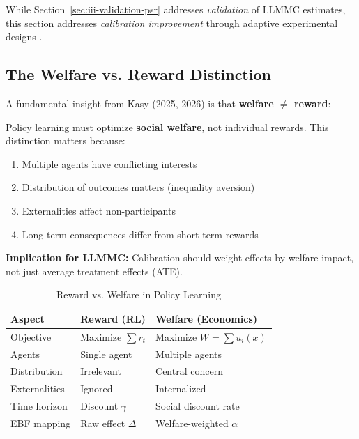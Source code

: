 While Section~\ref{sec:iii-validation-psr} addresses \emph{validation} of LLMMC estimates,
this section addresses \emph{calibration improvement} through adaptive experimental designs
\citep{PAP-kasy2021adaptive, PAP-caria2024refugees}.

\subsection{The Welfare vs. Reward Distinction}

A fundamental insight from Kasy (2025, 2026) is that \textbf{welfare $\neq$ reward}:

\begin{tcolorbox}[colback=blue!5!white, colframe=blue!75!black,
    title=Axiom CAL-6: Welfare-Reward Distinction (Kasy Criterion)]
Policy learning must optimize \textbf{social welfare}, not individual rewards.
This distinction matters because:
\begin{enumerate}[nosep]
\item Multiple agents have conflicting interests
\item Distribution of outcomes matters (inequality aversion)
\item Externalities affect non-participants
\item Long-term consequences differ from short-term rewards
\end{enumerate}

\textbf{Implication for LLMMC:} Calibration should weight effects by welfare impact,
not just average treatment effects (ATE).
\end{tcolorbox}

\begin{table}[h]
\centering
\caption{Reward vs. Welfare in Policy Learning}
\label{tab:reward-welfare}
\begin{tabular}{lll}
\toprule
\textbf{Aspect} & \textbf{Reward (RL)} & \textbf{Welfare (Economics)} \\
\midrule
Objective & Maximize $\sum r_t$ & Maximize $W = \sum u_i(x)$ \\
Agents & Single agent & Multiple agents \\
Distribution & Irrelevant & Central concern \\
Externalities & Ignored & Internalized \\
Time horizon & Discount $\gamma$ & Social discount rate \\
EBF mapping & Raw effect $\Delta$ & Welfare-weighted $\alpha$ \\
\bottomrule
\end{tabular}
\end{table}

